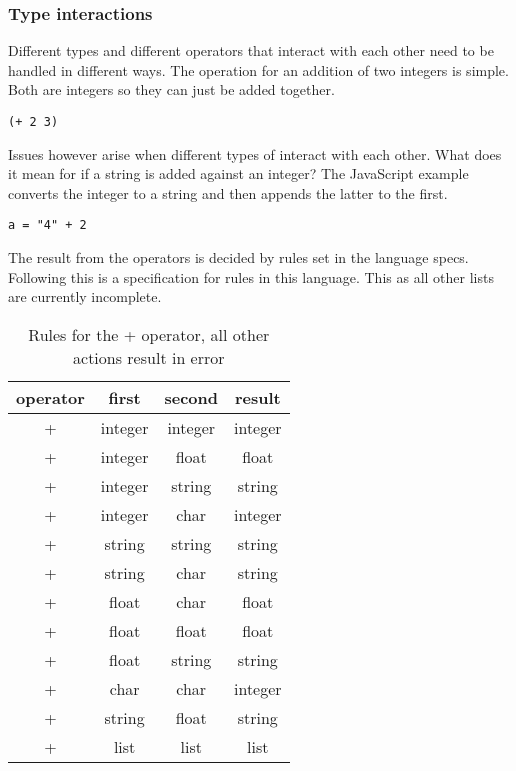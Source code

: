 \subsubsection{Type interactions}

Different types and different operators that interact with each other need to be handled in different ways. 
The operation for an addition of two integers is simple.
Both are integers so they can just be added together. 
\begin{lstlisting}[caption=Addition of two integers]
(+ 2 3)
\end{lstlisting}

Issues however arise when different types of interact with each other. 
What does it mean for if a string is added against an integer?
The JavaScript example converts the integer to a string and then appends the latter to the first. 
\begin{lstlisting}[caption=Enter this into the browser console and verify for yourself]
	a = "4" + 2
\end{lstlisting}
The result from the operators is decided by rules set in the language specs.
Following this is a specification for rules in this language.
This as all other lists are currently incomplete. 

\begin{table}[h!]
\begin{center}
\begin{tabular}{ |c|c|c|c| }
 \hline
 operator & first & second & result   \\ \hline
 + & integer & integer & integer   \\ \hline
 + & integer & float & float\\ 	\hline
 + & integer & string & string \\ \hline
 + & integer & char & integer \\ \hline
 + & string & string & string \\ \hline
 + & string & char & string \\ \hline
 + & float & char & float \\ \hline
 + & float & float & float \\ \hline
 + & float & string & string \\ \hline
 + & char & char & integer \\ \hline
 + & string & float & string \\ \hline
 + & list & list & list \\ \hline
\end{tabular}
\caption{Rules for the + operator, all other actions result in error}
\end{center}
\end{table}

